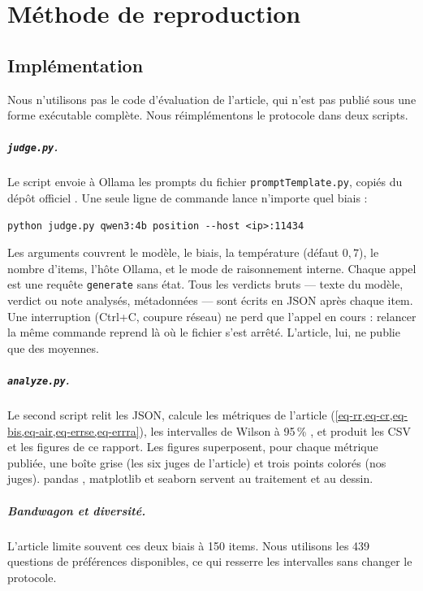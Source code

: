 \chapter{Méthode de reproduction}
\label{chap-method}

\section{Implémentation}

Nous n'utilisons pas le code d'évaluation de l'article, qui n'est pas publié sous une forme exécutable complète. Nous réimplémentons le protocole dans deux scripts.

\paragraph{\texttt{judge.py}.}
Le script envoie à Ollama \cite{ollama} les prompts du fichier \texttt{promptTemplate.py}, copiés du dépôt officiel \cite{calmdataset}. Une seule ligne de commande lance n'importe quel biais :
\begin{lstlisting}
python judge.py qwen3:4b position --host <ip>:11434
\end{lstlisting}
Les arguments couvrent le modèle, le biais, la température (défaut $0{,}7$), le nombre d'items, l'hôte Ollama, et le mode de raisonnement interne. Chaque appel est une requête \texttt{generate} sans état. Tous les verdicts bruts --- texte du modèle, verdict ou note analysés, métadonnées --- sont écrits en JSON après chaque item. Une interruption (Ctrl+C, coupure réseau) ne perd que l'appel en cours : relancer la même commande reprend là où le fichier s'est arrêté. L'article, lui, ne publie que des moyennes.

\paragraph{\texttt{analyze.py}.}
Le second script relit les JSON, calcule les métriques de l'article (\cref{eq-rr,eq-cr,eq-bis,eq-air,eq-errse,eq-errra}), les intervalles de Wilson à 95\,\% \cite{wilson1927}, et produit les CSV et les figures de ce rapport. Les figures superposent, pour chaque métrique publiée, une boîte grise (les six juges de l'article) et trois points colorés (nos juges). pandas \cite{pandas}, matplotlib \cite{matplotlib} et seaborn \cite{seaborn} servent au traitement et au dessin.

\paragraph{Bandwagon et diversité.}
L'article limite souvent ces deux biais à 150 items. Nous utilisons les 439 questions de préférences disponibles, ce qui resserre les intervalles sans changer le protocole.

